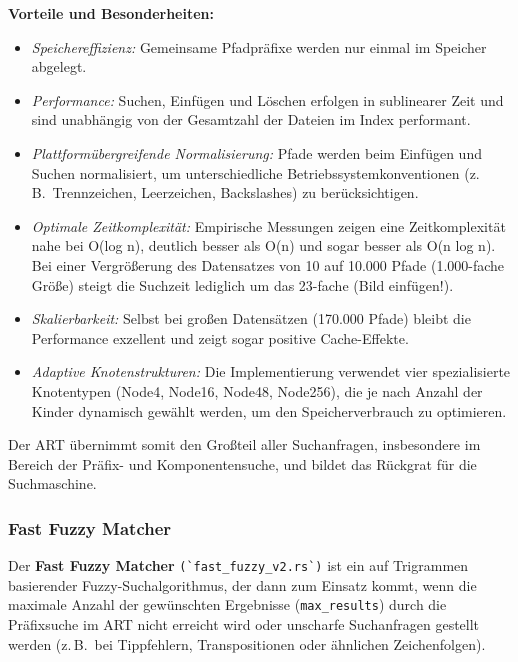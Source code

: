 \textbf{Vorteile und Besonderheiten:}
\begin{itemize}
  \item \textit{Speichereffizienz:} Gemeinsame Pfadpräfixe werden nur einmal im Speicher abgelegt.

  \item \textit{Performance:} Suchen, Einfügen und Löschen erfolgen in sublinearer Zeit und sind unabhängig von der Gesamtzahl der
    Dateien im Index performant.

  \item \textit{Plattformübergreifende Normalisierung:} Pfade werden beim Einfügen und Suchen normalisiert, um unterschiedliche
    Betriebssystemkonventionen (z.\,B.\ Trennzeichen, Leerzeichen, Backslashes) zu berücksichtigen.

  \item \textit{Optimale Zeitkomplexität:} Empirische Messungen zeigen eine Zeitkomplexität nahe bei O(log n), deutlich besser als
    O(n) und sogar besser als O(n log n). Bei einer Vergrößerung des Datensatzes von 10 auf 10.000 Pfade (1.000-fache Größe)
    steigt die Suchzeit lediglich um das 23-fache (Bild einfügen!).

  \item \textit{Skalierbarkeit:} Selbst bei großen Datensätzen (170.000 Pfade) bleibt die Performance exzellent und zeigt sogar
    positive Cache-Effekte.

  \item \textit{Adaptive Knotenstrukturen:} Die Implementierung verwendet vier spezialisierte Knotentypen (Node4, Node16, Node48,
    Node256), die je nach Anzahl der Kinder dynamisch gewählt werden, um den Speicherverbrauch zu optimieren.
\end{itemize}

Der ART übernimmt somit den Großteil aller Suchanfragen, insbesondere im Bereich der Präfix- und Komponentensuche, und bildet das Rückgrat für die Suchmaschine.

\subsubsection{Fast Fuzzy Matcher} Der \textbf{Fast Fuzzy Matcher} \verb|(`fast_fuzzy_v2.rs`)| ist ein auf Trigrammen basierender
Fuzzy-Suchalgorithmus, der dann zum Einsatz kommt, wenn die maximale Anzahl der gewünschten Ergebnisse (\texttt{max\_results})
durch die Präfixsuche im ART nicht erreicht wird oder unscharfe Suchanfragen gestellt werden (z.\,B.\ bei Tippfehlern,
Transpositionen oder ähnlichen Zeichenfolgen).


